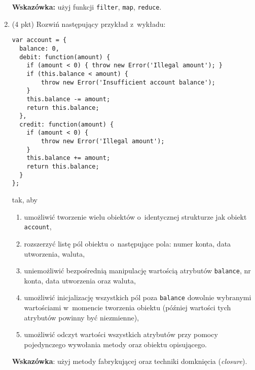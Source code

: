 \documentclass[12pt]{article}
\begin{document}
\begin{enumerate}
            \textbf{Wskazówka:} użyj funkcji \texttt{filter}, \texttt{map}, \texttt{reduce}.
        \item
            (4 pkt) Rozwiń następujący przykład z~wykładu:
            \begin{verbatim}
var account = {
  balance: 0,
  debit: function(amount) {
    if (amount < 0) { throw new Error('Illegal amount'); }
    if (this.balance < amount) {
        throw new Error('Insufficient account balance');
    }
    this.balance -= amount;
    return this.balance;
  },
  credit: function(amount) {
    if (amount < 0) {
        throw new Error('Illegal amount');
    }
    this.balance += amount;
    return this.balance;
  }
};
            \end{verbatim}
            tak, aby
            \begin{enumerate}
                \item umożliwić tworzenie wielu obiektów o~identycznej strukturze jak obiekt \texttt{account},
                \item rozszerzyć listę pól obiektu o~następujące pola: numer konta, data utworzenia, waluta,
                \item uniemożliwić bezpośrednią manipulację wartością atrybutów \texttt{balance}, nr konta, data utworzenia oraz waluta,
                \item umożliwić inicjalizację wszystkich pól poza \texttt{balance} dowolnie wybranymi wartościami w~momencie tworzenia obiektu (później wartości tych atrybutów powinny być niezmienne),
                \item umożliwić odczyt wartości wszystkich atrybutów przy pomocy pojedynczego wywołania metody oraz obiektu opisującego.
            \end{enumerate}
            \textbf{Wskazówka}: użyj metody fabrykującej oraz techniki domknięcia (\emph{closure}).
    \end{enumerate}
\end{document}
